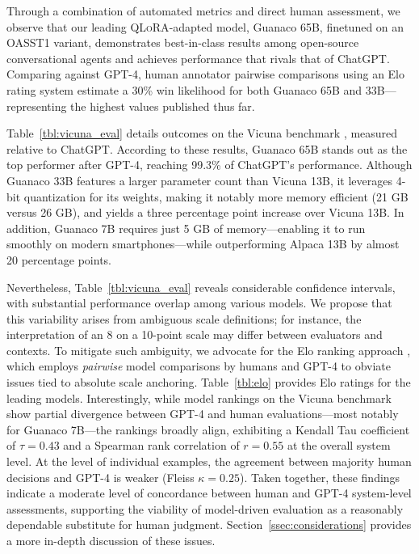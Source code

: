Through a combination of automated metrics and direct human assessment, we observe that our leading \textsc{QLoRA}-adapted model, {Guanaco} 65B, finetuned on an OASST1 variant, demonstrates best-in-class results among open-source conversational agents and achieves performance that rivals that of ChatGPT. Comparing against GPT-4, human annotator pairwise comparisons using an Elo rating system estimate a 30\% win likelihood for both {Guanaco} 65B and 33B—representing the highest values published thus far.

Table~\ref{tbl:vicuna_eval} details outcomes on the Vicuna benchmark \cite{vicuna2023}, measured relative to ChatGPT. According to these results, {Guanaco} 65B stands out as the top performer after GPT-4, reaching 99.3\% of ChatGPT’s performance. Although {Guanaco} 33B features a larger parameter count than Vicuna 13B, it leverages 4-bit quantization for its weights, making it notably more memory efficient (21 GB versus 26 GB), and yields a three percentage point increase over Vicuna 13B. In addition, {Guanaco} 7B requires just 5 GB of memory—enabling it to run smoothly on modern smartphones—while outperforming Alpaca 13B by almost 20 percentage points.

Nevertheless, Table~\ref{tbl:vicuna_eval} reveals considerable confidence intervals, with substantial performance overlap among various models. We propose that this variability arises from ambiguous scale definitions; for instance, the interpretation of an 8 on a 10-point scale may differ between evaluators and contexts. To mitigate such ambiguity, we advocate for the Elo ranking approach \citep{elo1967proposed}, which employs \textit{pairwise} model comparisons by humans and GPT-4 to obviate issues tied to absolute scale anchoring. Table~\ref{tbl:elo} provides Elo ratings for the leading models. Interestingly, while model rankings on the Vicuna benchmark show partial divergence between GPT-4 and human evaluations—most notably for Guanaco 7B—the rankings broadly align, exhibiting a Kendall Tau coefficient of $\tau=0.43$ and a Spearman rank correlation of $r=0.55$ at the overall system level. At the level of individual examples, the agreement between majority human decisions and GPT-4 is weaker (Fleiss $\kappa=0.25$). Taken together, these findings indicate a moderate level of concordance between human and GPT-4 system-level assessments, supporting the viability of model-driven evaluation as a reasonably dependable substitute for human judgment. Section~\ref{ssec:considerations} provides a more in-depth discussion of these issues.


